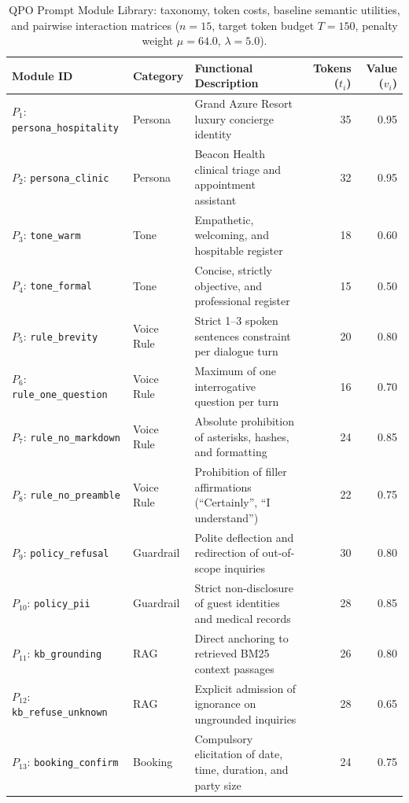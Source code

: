 \documentclass[review,12pt,times,authoryear]{elsarticle}
\theoremstyle{definition}
\begin{document}
\begin{table}[t]
\centering
\small
\setlength{\tabcolsep}{4pt}
\renewcommand{\arraystretch}{1.12}
\caption{QPO Prompt Module Library: taxonomy, token costs, baseline semantic utilities, and pairwise interaction matrices ($n = 15$, target token budget $T = 150$, penalty weight $\mu = 64.0$, $\lambda = 5.0$).}
\label{tab:modules}
\begin{tabularx}{\columnwidth}{@{}llXrr@{}}
\toprule
\textbf{Module ID} & \textbf{Category} & \textbf{Functional Description} & \textbf{Tokens ($t_i$)} & \textbf{Value ($v_i$)} \\
\midrule
$P_1$: \texttt{persona\_hospitality} & Persona & Grand Azure Resort luxury concierge identity & 35 & 0.95 \\
$P_2$: \texttt{persona\_clinic}      & Persona & Beacon Health clinical triage and appointment assistant & 32 & 0.95 \\
$P_3$: \texttt{tone\_warm}            & Tone & Empathetic, welcoming, and hospitable register & 18 & 0.60 \\
$P_4$: \texttt{tone\_formal}          & Tone & Concise, strictly objective, and professional register & 15 & 0.50 \\
$P_5$: \texttt{rule\_brevity}         & Voice Rule & Strict 1--3 spoken sentences constraint per dialogue turn & 20 & 0.80 \\
$P_6$: \texttt{rule\_one\_question}   & Voice Rule & Maximum of one interrogative question per turn & 16 & 0.70 \\
$P_7$: \texttt{rule\_no\_markdown}    & Voice Rule & Absolute prohibition of asterisks, hashes, and formatting & 24 & 0.85 \\
$P_8$: \texttt{rule\_no\_preamble}    & Voice Rule & Prohibition of filler affirmations (``Certainly'', ``I understand'') & 22 & 0.75 \\
$P_9$: \texttt{policy\_refusal}       & Guardrail & Polite deflection and redirection of out-of-scope inquiries & 30 & 0.80 \\
$P_{10}$: \texttt{policy\_pii}        & Guardrail & Strict non-disclosure of guest identities and medical records & 28 & 0.85 \\
$P_{11}$: \texttt{kb\_grounding}      & RAG & Direct anchoring to retrieved BM25 context passages & 26 & 0.80 \\
$P_{12}$: \texttt{kb\_refuse\_unknown}& RAG & Explicit admission of ignorance on ungrounded inquiries & 28 & 0.65 \\
$P_{13}$: \texttt{booking\_confirm}   & Booking & Compulsory elicitation of date, time, duration, and party size & 24 & 0.75 \\

\end{tabularx}
\end{table}
\end{document}

